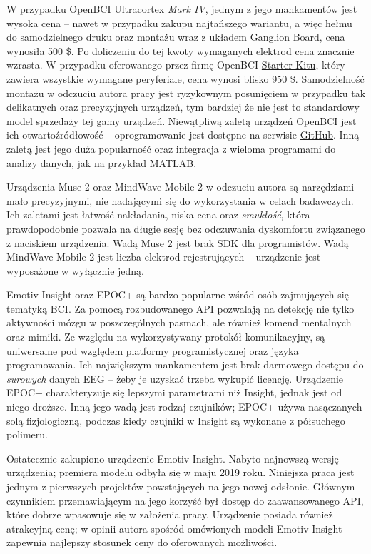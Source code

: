 \documentclass[skorowidz,skroty]{dyplomWEZUT}
\begin{document}
W przypadku OpenBCI Ultracortex \textit{Mark IV}, jednym z jego mankamentów jest wysoka cena -- nawet w przypadku zakupu najtańszego wariantu, a więc hełmu do samodzielnego druku oraz montażu wraz z układem Ganglion Board, cena wynosiła 500 \$. Po doliczeniu do tej kwoty wymaganych elektrod cena znacznie wzrasta. W przypadku oferowanego przez firmę OpenBCI \href{https://shop.openbci.com/collections/frontpage/products/d-i-y-neurotechnologists-starter-kit}{Starter Kitu}, który zawiera wszystkie wymagane peryferiale, cena wynosi blisko 950 \$. Samodzielność montażu w odczuciu autora pracy jest ryzykownym posunięciem w przypadku tak delikatnych oraz precyzyjnych urządzeń, tym bardziej że nie jest to standardowy model sprzedaży tej gamy urządzeń. Niewątpliwą zaletą urządzeń OpenBCI jest ich otwartoźródłowość -- oprogramowanie jest dostępne na serwisie \href{https://github.com/OpenBC}{GitHub}. Inną zaletą jest jego duża popularność oraz integracja z wieloma programami do analizy danych, jak na przykład MATLAB.

Urządzenia Muse 2 oraz MindWave Mobile 2 w odczuciu autora są narzędziami mało precyzyjnymi, nie nadającymi się do wykorzystania w celach badawczych. Ich zaletami jest łatwość nakładania, niska cena oraz \textit{smukłość}, która prawdopodobnie pozwala na długie sesję bez odczuwania dyskomfortu związanego z naciskiem urządzenia. Wadą Muse 2 jest brak SDK dla programistów. Wadą MindWave Mobile 2 jest liczba elektrod rejestrujących -- urządzenie jest wyposażone w wyłącznie jedną.

Emotiv Insight oraz EPOC+ są bardzo popularne wśród osób zajmujących się tematyką BCI. Za pomocą rozbudowanego API pozwalają na detekcję nie tylko aktywności mózgu w poszczególnych pasmach, ale również komend mentalnych oraz mimiki. Ze względu na wykorzystywany protokół komunikacyjny, są uniwersalne pod względem platformy programistycznej oraz języka programowania. Ich największym mankamentem jest brak darmowego dostępu do \textit{surowych} danych EEG -- żeby je uzyskać trzeba wykupić licencję. Urządzenie EPOC+ charakteryzuje się lepszymi parametrami niż Insight, jednak jest od niego droższe. Inną jego wadą jest rodzaj czujników; EPOC+ używa nasączanych solą fizjologiczną, podczas kiedy czujniki w Insight są wykonane z półsuchego polimeru.

Ostatecznie zakupiono urządzenie Emotiv Insight. Nabyto najnowszą wersję urządzenia; premiera modelu odbyła się w maju 2019 roku. Niniejsza praca jest jednym z pierwszych projektów powstających na jego nowej odsłonie. Głównym czynnikiem przemawiającym na jego korzyść był dostęp do zaawansowanego API, które dobrze wpasowuje się w założenia pracy. Urządzenie posiada również atrakcyjną cenę; w opinii autora spośród omówionych modeli Emotiv Insight zapewnia najlepszy stosunek ceny do oferowanych możliwości.
\end{document}
